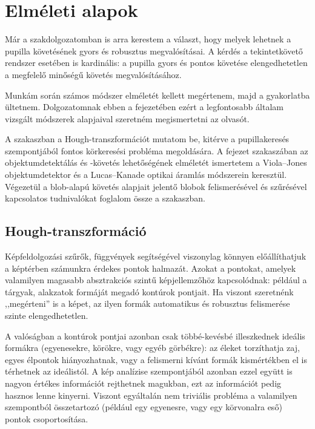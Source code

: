 \chapter{Elméleti alapok}\label{sect:elmeleti_alapok}

Már a szakdolgozatomban \cite{thesis_sajat} is arra kerestem a választ, hogy melyek lehetnek a pupilla követésének gyors és robusztus megvalósításai. A kérdés a tekintetkövető rendszer esetében is kardinális: a pupilla gyors és pontos követése elengedhetetlen a megfelelő minőségű követés megvalósításához.

Munkám során számos módszer elméletét kellett megértenem, majd a gyakorlatba ültetnem. Dolgozatomnak ebben a fejezetében ezért a legfontosabb általam vizsgált módszerek alapjaival szeretném megismertetni az olvasót.

\bigskip

A  szakaszban a Hough-transzformációt mutatom be, kitérve a pupillakeresés szempontjából fontos körkeresési probléma megoldására. A fejezet  szakaszában az objektumdetektálás és -követés lehetőségének elméletét ismertetem a Viola--Jones objektumdetektor és a Lucas--Kanade optikai áramlás módszerein keresztül. Végezetül a blob-alapú követés alapjait jelentő blobok felismerésével és szűrésével kapcsolatos tudnivalókat foglalom össze a  szakaszban.

\section{Hough-transzformáció}\label{sect:hough}

Képfeldolgozási szűrők, függvények segítségével viszonylag könnyen előállíthatjuk a képtérben számunkra érdekes pontok halmazát. Azokat a pontokat, amelyek valamilyen magasabb absztrakciós szintű képjellemzőhöz kapcsolódnak: például a tárgyak, alakzatok formáját megadó kontúrok pontjait. Ha viszont szeretnénk ,,megérteni'' is a képet, az ilyen formák automatikus és robusztus felismerése szinte elengedhetetlen.

A valóságban a kontúrok pontjai azonban csak többé-kevésbé illeszkednek ideális formákra (egyenesekre, körökre, vagy egyéb görbékre): az éleket torzíthatja zaj, egyes élpontok hiányozhatnak, vagy a felismerni kívánt formák kismértékben el is térhetnek az ideálistól. A kép analízise szempontjából azonban ezzel együtt is nagyon értékes információt rejthetnek magukban, ezt az információt pedig hasznos lenne kinyerni. Viszont egyáltalán nem triviális probléma a valamilyen szempontból összetartozó (például egy egyenesre, vagy egy körvonalra eső) pontok csoportosítása.

